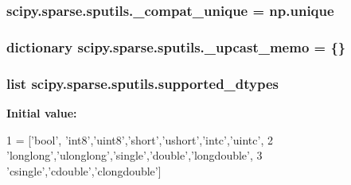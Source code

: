 \subsubsection[{\+\_\+compat\+\_\+unique}]{\setlength{\rightskip}{0pt plus 5cm}scipy.\+sparse.\+sputils.\+\_\+compat\+\_\+unique = np.\+unique}\label{namespacescipy_1_1sparse_1_1sputils_acc5295c194462ea655cd863d33ccc4f1}
\hypertarget{namespacescipy_1_1sparse_1_1sputils_a8204ccd13c7a8a22846cfe288dbb74ac}{}
\subsubsection[{\+\_\+upcast\+\_\+memo}]{\setlength{\rightskip}{0pt plus 5cm}dictionary scipy.\+sparse.\+sputils.\+\_\+upcast\+\_\+memo = \{\}}\label{namespacescipy_1_1sparse_1_1sputils_a8204ccd13c7a8a22846cfe288dbb74ac}
\hypertarget{namespacescipy_1_1sparse_1_1sputils_a00aac4a974e29d45ad6f4410fccc9bb5}{}
\subsubsection[{supported\+\_\+dtypes}]{\setlength{\rightskip}{0pt plus 5cm}list scipy.\+sparse.\+sputils.\+supported\+\_\+dtypes}\label{namespacescipy_1_1sparse_1_1sputils_a00aac4a974e29d45ad6f4410fccc9bb5}
{\bfseries Initial value\+:}
\begin{DoxyCode}
1 = [\textcolor{stringliteral}{'bool'}, \textcolor{stringliteral}{'int8'},\textcolor{stringliteral}{'uint8'},\textcolor{stringliteral}{'short'},\textcolor{stringliteral}{'ushort'},\textcolor{stringliteral}{'intc'},\textcolor{stringliteral}{'uintc'},
2         \textcolor{stringliteral}{'longlong'},\textcolor{stringliteral}{'ulonglong'},\textcolor{stringliteral}{'single'},\textcolor{stringliteral}{'double'},\textcolor{stringliteral}{'longdouble'},
3         \textcolor{stringliteral}{'csingle'},\textcolor{stringliteral}{'cdouble'},\textcolor{stringliteral}{'clongdouble'}]
\end{DoxyCode}

